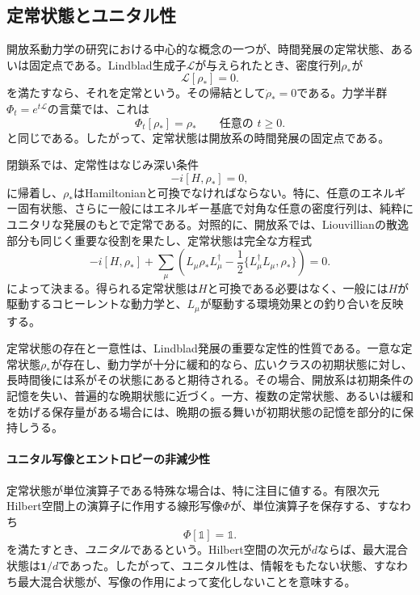 \documentclass[a4paper,11pt,oneside]{article}
\theoremstyle{definition}
\numberwithin{equation}{section}
\begin{document}
\subsection{定常状態とユニタル性}



開放系動力学の研究における中心的な概念の一つが、時間発展の定常状態、あるいは固定点である。Lindblad生成子$\mathcal L$が与えられたとき、密度行列$\rho_\ast$が
\begin{equation}
\mathcal L[\rho_\ast] = 0 .
\end{equation}
を満たすなら、それを定常という。その帰結として$\dot \rho_{\ast}=0 $である。力学半群$\Phi_t=e^{t\mathcal L}$の言葉では、これは
\begin{equation}
\Phi_t[\rho_\ast]=\rho_\ast
\qquad
\text{任意の } t\geq 0 .
\end{equation}
と同じである。したがって、定常状態は開放系の時間発展の固定点である。



閉鎖系では、定常性はなじみ深い条件
\begin{equation}
-i[H,\rho_\ast]=0 ,
\end{equation}
に帰着し、$\rho_\ast$はHamiltonianと可換でなければならない。特に、任意のエネルギー固有状態、さらに一般にはエネルギー基底で対角な任意の密度行列は、純粋にユニタリな発展のもとで定常である。対照的に、開放系では、Liouvillianの散逸部分も同じく重要な役割を果たし、定常状態は完全な方程式
\begin{equation}
-i[H,\rho_\ast]
+
\sum_\mu
\left(
L_\mu \rho_\ast L_\mu^\dagger
-\frac12\{L_\mu^\dagger L_\mu,\rho_\ast\}
\right)
=0 .
\end{equation}
によって決まる。得られる定常状態は$H$と可換である必要はなく、一般には$ H$が駆動するコヒーレントな動力学と、$ L_{\mu}$が駆動する環境効果との釣り合いを反映する。



定常状態の存在と一意性は、Lindblad発展の重要な定性的性質である。一意な定常状態$\rho_\ast$が存在し、動力学が十分に緩和的なら、広いクラスの初期状態に対し、長時間後には系がその状態にあると期待される。その場合、開放系は初期条件の記憶を失い、普遍的な晩期状態に近づく。一方、複数の定常状態、あるいは緩和を妨げる保存量がある場合には、晩期の振る舞いが初期状態の記憶を部分的に保持しうる。





\paragraph{ユニタル写像とエントロピーの非減少性} 定常状態が単位演算子である特殊な場合は、特に注目に値する。有限次元Hilbert空間上の演算子に作用する線形写像$\Phi$が、単位演算子を保存する、すなわち
\begin{equation}
\Phi[\mathds 1] = \mathds 1 .
\end{equation}
を満たすとき、\textit{ユニタル}であるという。Hilbert空間の次元が$d$ならば、最大混合状態は$ \mathbf{1}/d $であった。したがって、ユニタル性は、情報をもたない状態、すなわち最大混合状態が、写像の作用によって変化しないことを意味する。
\end{document}
